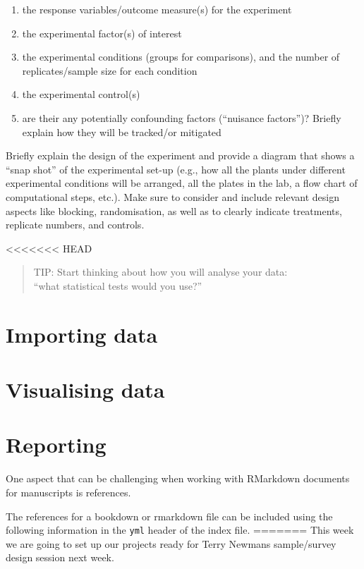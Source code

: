 \documentclass[
]{book}
\providecommand{\tightlist}{%
  \setlength{\itemsep}{0pt}\setlength{\parskip}{0pt}}
\begin{document}
\begin{enumerate}
\def\labelenumi{\arabic{enumi})}
\tightlist
\item
  the response variables/outcome measure(s) for the experiment
\item
  the experimental factor(s) of interest
\item
  the experimental conditions (groups for comparisons), and the number of replicates/sample size for each condition
\item
  the experimental control(s)
\item
  are their any potentially confounding factors (``nuisance factors'')? Briefly explain how they will be tracked/or mitigated
\end{enumerate}

Briefly explain the design of the experiment and provide a diagram that shows a ``snap shot'' of the experimental set-up (e.g., how all the plants under different experimental conditions will be arranged, all the plates in the lab, a flow chart of computational steps, etc.). Make sure to consider and include relevant design aspects like blocking, randomisation, as well as to clearly indicate treatments, replicate numbers, and controls.

<<<<<<< HEAD
\begin{quote}
TIP: Start thinking about how you will analyse your data:\\
``what statistical tests would you use?''
\end{quote}

\hypertarget{importing-data}{%
\section{Importing data}\label{importing-data}}

\hypertarget{visualising-data}{%
\section{Visualising data}\label{visualising-data}}

\hypertarget{reporting}{%
\section{Reporting}\label{reporting}}

One aspect that can be challenging when working with RMarkdown documents for manuscripts is references.

The references for a bookdown or rmarkdown file can be included using the following information in the \texttt{yml} header of the index file.
=======
This week we are going to set up our projects ready for Terry Newmans sample/survey design session next week.
\end{document}
